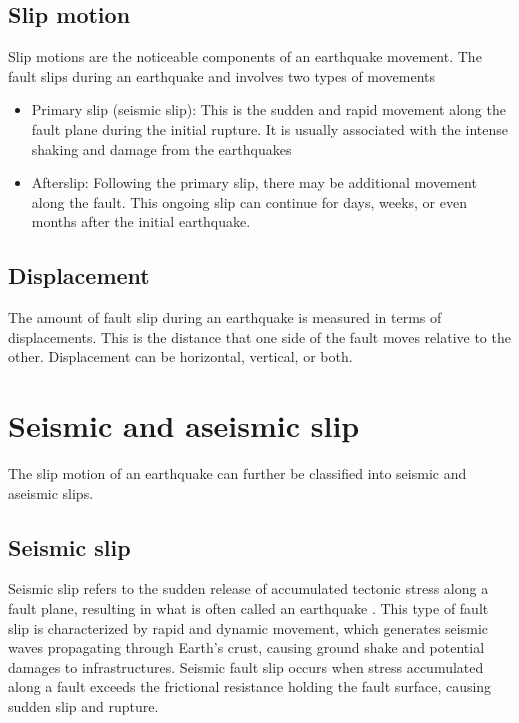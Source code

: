 \subsection{Slip motion}
Slip motions are the noticeable components of an earthquake movement.
The fault slips during an earthquake and involves two types of movements
\begin{itemize}
    \item Primary slip (seismic slip): This is the sudden and rapid movement along the fault plane during the initial rupture. It is usually associated with the intense shaking and damage from the earthquakes
    \item Afterslip: Following the primary slip, there may be additional movement along the fault. This ongoing slip can continue for days, weeks, or even months after the initial earthquake.
\end{itemize}

\subsection{Displacement}
The amount of fault slip during an earthquake is measured in terms of displacements. 
This is the distance that one side of the fault moves relative to the other.
Displacement can be horizontal, vertical, or both.


\section{Seismic and aseismic slip}
The slip motion of an earthquake can further be classified into seismic and aseismic slips.
\subsection{Seismic slip}
Seismic slip refers to the sudden release of accumulated tectonic stress along a fault plane, resulting in what is often called an earthquake \citep{cowan1999faults}. 
This type of fault slip is characterized by rapid and dynamic movement, which generates seismic waves propagating through Earth's crust, causing ground shake and potential damages to infrastructures.
Seismic fault slip occurs when stress accumulated along a fault exceeds the frictional resistance holding the fault surface, causing sudden slip and rupture.
